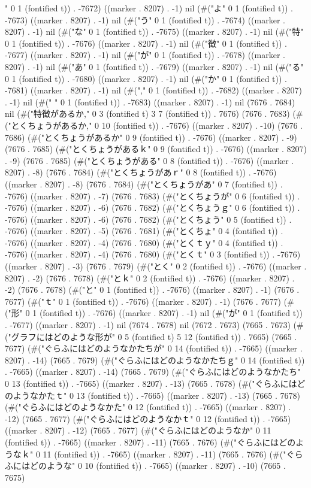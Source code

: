 " 0 1 (fontified t)) . -7672) ((marker . 8207) . -1) nil (#("よ" 0 1 (fontified t)) . -7673) ((marker . 8207) . -1) nil (#("う" 0 1 (fontified t)) . -7674) ((marker . 8207) . -1) nil (#("な" 0 1 (fontified t)) . -7675) ((marker . 8207) . -1) nil (#("特" 0 1 (fontified t)) . -7676) ((marker . 8207) . -1) nil (#("徴" 0 1 (fontified t)) . -7677) ((marker . 8207) . -1) nil (#("が" 0 1 (fontified t)) . -7678) ((marker . 8207) . -1) nil (#("あ" 0 1 (fontified t)) . -7679) ((marker . 8207) . -1) nil (#("る" 0 1 (fontified t)) . -7680) ((marker . 8207) . -1) nil (#("か" 0 1 (fontified t)) . -7681) ((marker . 8207) . -1) nil (#("," 0 1 (fontified t)) . -7682) ((marker . 8207) . -1) nil (#(" " 0 1 (fontified t)) . -7683) ((marker . 8207) . -1) nil (7676 . 7684) nil (#("特徴があるか," 0 3 (fontified t) 3 7 (fontified t)) . 7676) (7676 . 7683) (#("とくちょうがあるか," 0 10 (fontified t)) . -7676) ((marker . 8207) . -10) (7676 . 7686) (#("とくちょうがあるか" 0 9 (fontified t)) . -7676) ((marker . 8207) . -9) (7676 . 7685) (#("とくちょうがあるｋ" 0 9 (fontified t)) . -7676) ((marker . 8207) . -9) (7676 . 7685) (#("とくちょうがある" 0 8 (fontified t)) . -7676) ((marker . 8207) . -8) (7676 . 7684) (#("とくちょうがあｒ" 0 8 (fontified t)) . -7676) ((marker . 8207) . -8) (7676 . 7684) (#("とくちょうがあ" 0 7 (fontified t)) . -7676) ((marker . 8207) . -7) (7676 . 7683) (#("とくちょうが" 0 6 (fontified t)) . -7676) ((marker . 8207) . -6) (7676 . 7682) (#("とくちょうｇ" 0 6 (fontified t)) . -7676) ((marker . 8207) . -6) (7676 . 7682) (#("とくちょう" 0 5 (fontified t)) . -7676) ((marker . 8207) . -5) (7676 . 7681) (#("とくちょ" 0 4 (fontified t)) . -7676) ((marker . 8207) . -4) (7676 . 7680) (#("とくｔｙ" 0 4 (fontified t)) . -7676) ((marker . 8207) . -4) (7676 . 7680) (#("とくｔ" 0 3 (fontified t)) . -7676) ((marker . 8207) . -3) (7676 . 7679) (#("とく" 0 2 (fontified t)) . -7676) ((marker . 8207) . -2) (7676 . 7678) (#("とｋ" 0 2 (fontified t)) . -7676) ((marker . 8207) . -2) (7676 . 7678) (#("と" 0 1 (fontified t)) . -7676) ((marker . 8207) . -1) (7676 . 7677) (#("ｔ" 0 1 (fontified t)) . -7676) ((marker . 8207) . -1) (7676 . 7677) (#("形" 0 1 (fontified t)) . -7676) ((marker . 8207) . -1) nil (#("が" 0 1 (fontified t)) . -7677) ((marker . 8207) . -1) nil (7674 . 7678) nil (7672 . 7673) (7665 . 7673) (#("グラフにはどのような形が" 0 5 (fontified t) 5 12 (fontified t)) . 7665) (7665 . 7677) (#("ぐらふにはどのようなかたちが" 0 14 (fontified t)) . -7665) ((marker . 8207) . -14) (7665 . 7679) (#("ぐらふにはどのようなかたちｇ" 0 14 (fontified t)) . -7665) ((marker . 8207) . -14) (7665 . 7679) (#("ぐらふにはどのようなかたち" 0 13 (fontified t)) . -7665) ((marker . 8207) . -13) (7665 . 7678) (#("ぐらふにはどのようなかたｔ" 0 13 (fontified t)) . -7665) ((marker . 8207) . -13) (7665 . 7678) (#("ぐらふにはどのようなかた" 0 12 (fontified t)) . -7665) ((marker . 8207) . -12) (7665 . 7677) (#("ぐらふにはどのようなかｔ" 0 12 (fontified t)) . -7665) ((marker . 8207) . -12) (7665 . 7677) (#("ぐらふにはどのようなか" 0 11 (fontified t)) . -7665) ((marker . 8207) . -11) (7665 . 7676) (#("ぐらふにはどのようなｋ" 0 11 (fontified t)) . -7665) ((marker . 8207) . -11) (7665 . 7676) (#("ぐらふにはどのような" 0 10 (fontified t)) . -7665) ((marker . 8207) . -10) (7665 . 7675) 